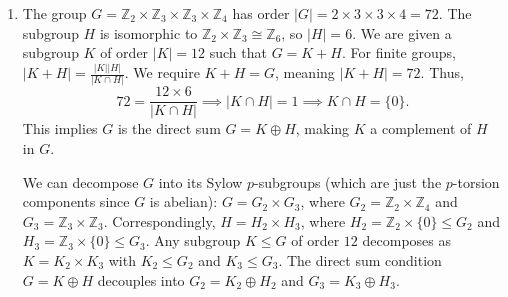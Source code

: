 \documentclass[10pt,a4paper]{article}
\begin{document}
\begin{enumerate}[label=\fbox{\arabic*}]
\begin{enumerate}[label=(\arabic*)]
\begin{itemize}
            \item \textbf{Case $a = -1$:} Substituting $a = -1$ into the reduced matrix yields:
            \[
              \begin{pmatrix} 1 & -1 & 1 & 0 \\ 0 & -1 & 0 & 1 \\ 0 & 0 & -1 & 0 \\ 0 & 0 & 0 & 0 \end{pmatrix}.
            \]
            There are exactly $3$ non-zero rows (Rows 1, 2, and 3). Thus, the rank of the matrix is $3$, meaning $\dim(\langle w_1, w_2, w_3, w_4 \rangle) = 3$.
          \end{itemize}
        \end{enumerate}

  \item %
        The group $G = \mathbb{Z}_2 \times \mathbb{Z}_3 \times \mathbb{Z}_3 \times \mathbb{Z}_4$ has order $|G| = 2 \times 3 \times 3 \times 4 = 72$.
        The subgroup $H$ is isomorphic to $\mathbb{Z}_2 \times \mathbb{Z}_3 \cong \mathbb{Z}_6$, so $|H| = 6$.
        We are given a subgroup $K$ of order $|K| = 12$ such that $G = K + H$.
        For finite groups, $|K + H| = \frac{|K||H|}{|K \cap H|}$.
        We require $K + H = G$, meaning $|K + H| = 72$. Thus,
        \[
          72 = \frac{12 \times 6}{|K \cap H|} \implies |K \cap H| = 1 \implies K \cap H = \{0\}.
        \]
        This implies $G$ is the direct sum $G = K \oplus H$, making $K$ a complement of $H$ in $G$.
        
        We can decompose $G$ into its Sylow $p$-subgroups (which are just the $p$-torsion components since $G$ is abelian):
        $G = G_2 \times G_3$, where $G_2 = \mathbb{Z}_2 \times \mathbb{Z}_4$ and $G_3 = \mathbb{Z}_3 \times \mathbb{Z}_3$.
        Correspondingly, $H = H_2 \times H_3$, where $H_2 = \mathbb{Z}_2 \times \{0\} \le G_2$ and $H_3 = \mathbb{Z}_3 \times \{0\} \le G_3$.
        Any subgroup $K \le G$ of order $12$ decomposes as $K = K_2 \times K_3$ with $K_2 \le G_2$ and $K_3 \le G_3$.
        The direct sum condition $G = K \oplus H$ decouples into $G_2 = K_2 \oplus H_2$ and $G_3 = K_3 \oplus H_3$.
        

\end{enumerate}
\end{document}
